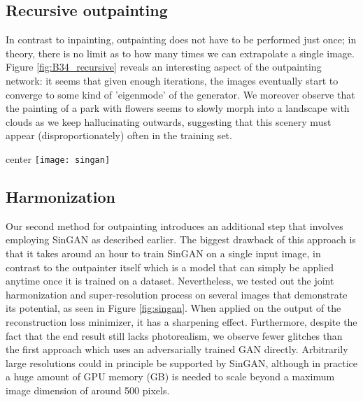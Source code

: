 \documentclass[twocolumn,showpacs,nofootinbib,aps,superscriptaddress,eqsecnum,prd,notitlepage,showkeys,10pt]{revtex4-1}
\begin{document}
\subsection{Recursive outpainting}

\hspace{\parindent} In contrast to inpainting, outpainting does not have to be performed just once; in theory, there is no limit as to how many times we can extrapolate a single image. Figure \ref{fig:B34_recursive} reveals an interesting aspect of the outpainting network: it seems that given enough iterations, the images eventually start to converge to some kind of 'eigenmode' of the generator. We moreover observe that the painting of a park with flowers seems to slowly morph into a landscape with clouds as we keep hallucinating outwards, suggesting that this scenery must appear (disproportionately) often in the training set.

\begin{figure*}[tp]
\centering
  \begin{adjustbox}{center}
  \texttt{[image: singan]}
  \end{adjustbox}
  \caption{Qualitative comparison of outpainting without adversarial loss followed by SinGAN harmonization (which has an adversarial aspect by nature), versus direct adversarial outpainting with the proposed GAN.}
  \label{fig:singan}
\end{figure*}

\subsection{Harmonization}

\hspace{\parindent} Our second method for outpainting introduces an additional step that involves employing SinGAN as described earlier. The biggest drawback of this approach is that it takes around an hour to train SinGAN on a single input image, in contrast to the outpainter itself which is a model that can simply be applied anytime once it is trained on a dataset. Nevertheless, we tested out the joint harmonization and super-resolution process on several images that demonstrate its potential, as seen in Figure \ref{fig:singan}. When applied on the output of the reconstruction loss minimizer, it has a sharpening effect. Furthermore, despite the fact that the end result still lacks photorealism, we observe fewer glitches than the first approach which uses an adversarially trained GAN directly. Arbitrarily large resolutions could in principle be supported by SinGAN, although in practice a huge amount of GPU memory (GB) is needed to scale beyond a maximum image dimension of around 500 pixels.
\end{document}
